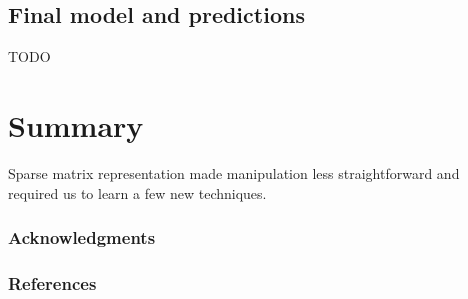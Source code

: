 \documentclass{article}
\begin{document}
  \subsection{Final model and predictions}
  TODO


\section{Summary}
  Sparse matrix representation made manipulation less straightforward and required us to learn a few new techniques.

  \subsubsection*{Acknowledgments}

  \subsubsection*{References}
\end{document}

